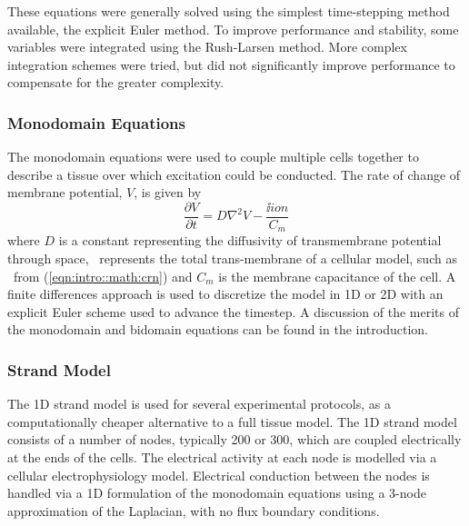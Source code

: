 These equations were generally solved using the simplest time-stepping method
available, the explicit Euler method.
To improve performance and stability, some variables were integrated using the
Rush-Larsen method.
More complex integration schemes were tried, but did not significantly improve
performance to compensate for the greater complexity.

\subsubsection{Monodomain Equations}

The monodomain equations were used to couple multiple cells together to describe
a tissue over which excitation could be conducted.
The rate of change of membrane potential, $V$, is given by
\begin{equation}
\label{eqn:toolkit:monodomain}
\frac{\partial V}{\partial t} = D \nabla^{2} V - \frac{\ii{ion}}{C_{m}}
\end{equation}
where $D$ is a constant representing the diffusivity of transmembrane potential through
space, \ represents the total trans-membrane of a cellular model, such
as \ from (\ref{eqn:intro::math:crn}) and $C_{m}$ is the membrane capacitance
of the cell.
A finite differences approach is used to discretize the model in 1D or 2D with
an explicit Euler scheme used to advance the timestep.
A discussion of the merits of the monodomain and bidomain equations can be found
in the introduction.

\subsubsection{Strand Model}

% 

The 1D strand model is used for several experimental protocols, as
a computationally cheaper alternative to a full tissue model.
The 1D strand model consists of a number of nodes, typically 200 or 300, which
are coupled electrically at the ends of the cells.
The electrical activity at each node is modelled via a cellular
electrophysiology model.
Electrical conduction between the nodes is handled via a 1D formulation of the
monodomain equations using a 3-node approximation of the Laplacian, with no
flux boundary conditions.



